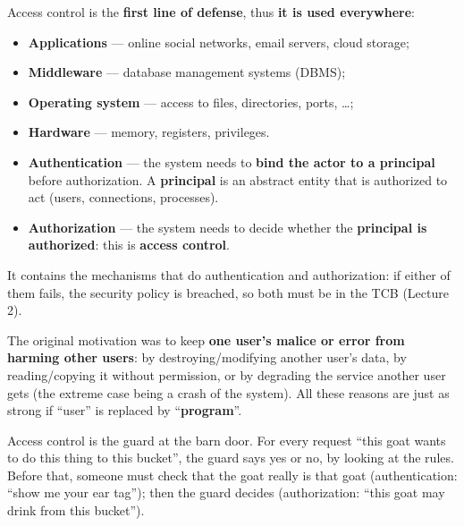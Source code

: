 \begin{rembox}[title=Why is access control so important?]
Access control is the \textbf{first line of defense}, thus \textbf{it is used
everywhere}:
\begin{itemize}
  \item \textbf{Applications} --- online social networks, email servers, cloud storage;
  \item \textbf{Middleware} --- database management systems (DBMS);
  \item \textbf{Operating system} --- access to files, directories, ports, \ldots;
  \item \textbf{Hardware} --- memory, registers, privileges.
\end{itemize}
\end{rembox}

\begin{defnbox}[title=Authentication vs.\ authorization]
\begin{itemize}
  \item \textbf{Authentication} --- the system needs to \textbf{bind the actor to a
        principal} before authorization. A \textbf{principal} is an abstract entity
        that is authorized to act (users, connections, processes).
  \item \textbf{Authorization} --- the system needs to decide whether the
        \textbf{principal is authorized}: this is \textbf{access control}.
\end{itemize}
\end{defnbox}

\begin{warnbox}[title=Trusted Computing Base (TCB)]
It contains the mechanisms that do authentication and authorization: if either of them fails,
the security policy is breached, so both must be in the TCB (Lecture 2).
\end{warnbox}

\begin{rembox}[title={Origin of protection mechanisms (Lampson, 1971)}]
The original motivation was to keep \textbf{one user's malice or error from harming other
users}: by destroying/modifying another user's data, by reading/copying it without
permission, or by degrading the service another user gets (the extreme case being a
crash of the system). All these reasons are just as strong if ``user'' is replaced by
``\textbf{program}''.
\end{rembox}

\begin{goatbox}
Access control is the guard at the barn door. For every request ``this goat wants to do this
thing to this bucket'', the guard says yes or no, by looking at the rules. Before that, someone
must check that the goat really is that goat (authentication: ``show me your ear tag''); then the
guard decides (authorization: ``this goat may drink from this bucket'').
\end{goatbox}

